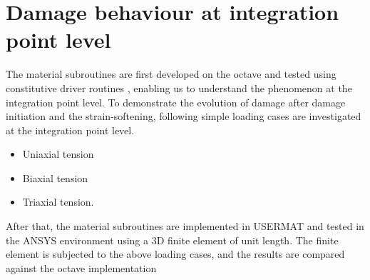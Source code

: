 \documentclass[12pt,a4paper,twoside,openright]{report}
\begin{document}
\section{Damage behaviour at integration point level}
\indent\indent\indent The material subroutines are first developed on the octave and tested using constitutive driver routines \citep{codes}, enabling us to understand the phenomenon at the integration point level. To demonstrate the evolution of damage after damage initiation and the strain-softening, following simple loading cases are investigated at the integration point level.
\begin{itemize}
\item Uniaxial tension
\item Biaxial tension
\item Triaxial tension.
\end{itemize} 
After that, the material subroutines are implemented in USERMAT and tested in the ANSYS environment using a 3D finite element of unit length. The finite element is subjected to the above loading cases, and the results are compared against the octave implementation
\FloatBarrier
\end{document}
